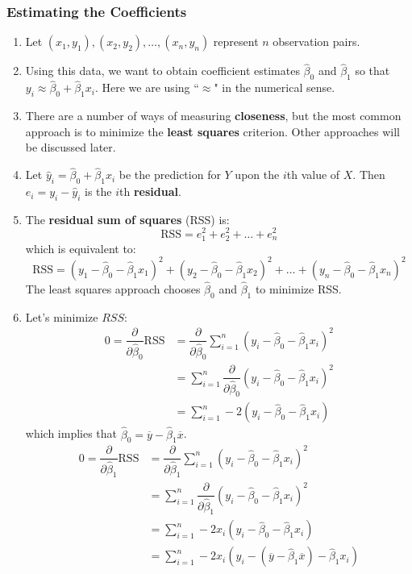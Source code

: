\documentclass[10pt]{article}
\newcommand{\pd}[2]{\dfrac{\partial #1}{\partial #2}}
\begin{document}
\subsubsection{Estimating the Coefficients} 
\begin{enumerate}
	\item Let $(x_1, y_1), (x_2, y_2), \dots, (x_n, y_n)$ represent $n$ observation pairs.
	\item Using this data, we want to obtain coefficient estimates $\hat \beta_0$ and $\hat \beta_1$ so that $ y_i \approx \hat \beta_0 + \hat \beta_1 x_i$.  Here we are using ``$\approx$" in the numerical sense.
	\item There are a number of ways of measuring \textbf{closeness}, but the most common approach is to minimize the \textbf{least squares} criterion. Other approaches will be discussed later.
	\item  Let $\hat y_i =  \hat \beta_0 + \hat \beta_1 x_i$ be the prediction for $Y$ upon the $i$th value of $X$.  Then $e_i = y_i - \hat y_i$ is the $i$th \textbf{residual}.
	\item The \textbf{residual sum of squares} (RSS) is:
	$$\text{RSS} = e_1^2 + e_2^2 + \dots + e_n^2$$
	which is equivalent to:
	$$\text{RSS} = ( y_1 - \hat \beta_0 - \hat \beta_1 x_1)^2 + ( y_2 - \hat \beta_0 - \hat \beta_1 x_2)^2 + \dots + ( y_n - \hat \beta_0 - \hat \beta_1 x_n)^2$$
	The least squares approach chooses $\hat \beta_0$ and $\hat \beta_1$ to minimize RSS.
	\item Let's minimize $RSS$:
	\begin{align*}
	0 = \pd{}{\hat \beta_0} \text{RSS} &= \pd{}{\hat \beta_0} \sum_{i = 1}^n (y_i - \hat \beta_0 - \hat \beta_1 x_i)^2 \\  
	&= \sum_{i = 1}^n \pd{}{\hat \beta_0} (y_i - \hat \beta_0 - \hat \beta_1 x_i)^2 \\
	&= \sum_{i = 1}^n -2(y_i - \hat \beta_0 - \hat \beta_1 x_i) 
	\end{align*}
	which implies that $\hat \beta_0 = \overline{y} - \hat \beta_1 \overline{x}$.
	\begin{align*}
	0 = \pd{}{\hat \beta_1} \text{RSS} &= \pd{}{\hat \beta_1} \sum_{i = 1}^n (y_i - \hat \beta_0 - \hat \beta_1 x_i)^2 \\  
	&= \sum_{i = 1}^n \pd{}{\hat \beta_1} (y_i - \hat \beta_0 - \hat \beta_1 x_i)^2 \\
	&= \sum_{i = 1}^n -2x_i(y_i - \hat \beta_0 - \hat \beta_1 x_i) \\
	&= \sum_{i = 1}^n -2x_i(y_i - (\overline{y} - \hat\beta_1 \overline{x}) - \hat \beta_1 x_i) \\

\end{align*}
\end{enumerate}
\end{document}
